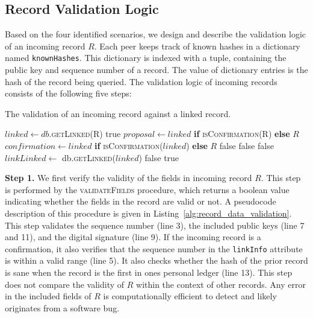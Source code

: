 \subsection{Record Validation Logic}
\label{sec:validation_logic}
Based on the four identified scenarios, we design and describe the validation logic of an incoming record $ R $.
Each peer keeps track of known hashes in a dictionary named \texttt{knownHashes}.
This dictionary is indexed with a tuple, containing the public key and sequence number of a record.
The value of dictionary entries is the hash of the record being queried.
The validation logic of incoming records consists of the following five steps:

\begin{algorithm}[t]
	\caption{The validation of an incoming record against a linked record.}
	\label{alg:record_validation_step3}
	\begin{algorithmic}[1]
		  
		\State $ linked \leftarrow db $.\textsc{getLinked(R)}
		\State \Return true
		\EndIf
		\State
		\State $ proposal \leftarrow linked $ \textbf{if} \textsc{isConfirmation(R)} \textbf{else} $ R $
		\State $ confirmation \leftarrow linked $ \textbf{if} \textsc{isConfirmation($ linked $)} \textbf{else} $ R $
		\State
		\State \Return false
		\EndIf
		\State \Return false
		\EndIf
		\State \Return false
		\EndIf
		\State $ linkLinked \leftarrow $ db.\textsc{getLinked(}$ linked $\textsc{)}
		\State \Return false
		\EndIf
		\State \Return true
		\EndProcedure
	\end{algorithmic}
\end{algorithm}

\textbf{Step 1.}
We first verify the validity of the fields in incoming record $ R $.
This step is performed by the \textsc{validateFields} procedure, which returns a boolean value indicating whether the fields in the record are valid or not.
A pseudocode description of this procedure is given in Listing~\ref{alg:record_data_validation}.
This step validates the sequence number (line 3), the included public keys (line 7 and 11), and the digital signature (line 9).
If the incoming record is a confirmation, it also verifies that the sequence number in the \texttt{linkInfo} attribute is within a valid range (line 5).
It also checks whether the hash of the prior record is sane when the record is the first in ones personal ledger (line 13).
This step does not compare the validity of $ R $ within the context of other records.
Any error in the included fields of $ R $ is computationally efficient to detect and likely originates from a software bug.

